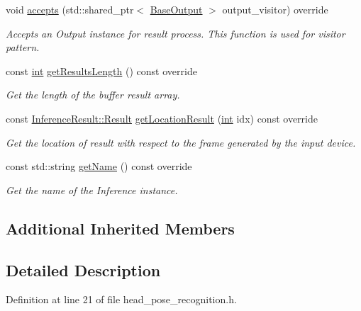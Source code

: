 \begin{DoxyCompactItemize}
void \hyperlink{classopenvino__service_1_1HeadPoseDetection_a32d824cdba6b6655a1280b1c01bce13e}{accepts} (std\+::shared\+\_\+ptr$<$ \hyperlink{classBaseOutput}{Base\+Output} $>$ output\+\_\+visitor) override
\begin{DoxyCompactList}\small\item\em Accepts an Output instance for result process. This function is used for visitor pattern. \end{DoxyCompactList}\item 
const \hyperlink{CMakeCache_8txt_a79a3d8790b2588b09777910863574e09}{int} \hyperlink{classopenvino__service_1_1HeadPoseDetection_a12cda8df1f3bdb640a27c17d36bb18ae}{get\+Results\+Length} () const override
\begin{DoxyCompactList}\small\item\em Get the length of the buffer result array. \end{DoxyCompactList}\item 
const \hyperlink{structInferenceResult_1_1Result}{Inference\+Result\+::\+Result} \hyperlink{classopenvino__service_1_1HeadPoseDetection_a2e85b9f74da265a413fd634106514ea9}{get\+Location\+Result} (\hyperlink{CMakeCache_8txt_a79a3d8790b2588b09777910863574e09}{int} idx) const override
\begin{DoxyCompactList}\small\item\em Get the location of result with respect to the frame generated by the input device. \end{DoxyCompactList}\item 
const std\+::string \hyperlink{classopenvino__service_1_1HeadPoseDetection_ae9333037746d10b2aef1cd1d4ec0cf91}{get\+Name} () const override
\begin{DoxyCompactList}\small\item\em Get the name of the Inference instance. \end{DoxyCompactList}\end{DoxyCompactItemize}
\subsection*{Additional Inherited Members}


\subsection{Detailed Description}


Definition at line 21 of file head\+\_\+pose\+\_\+recognition.\+h.



